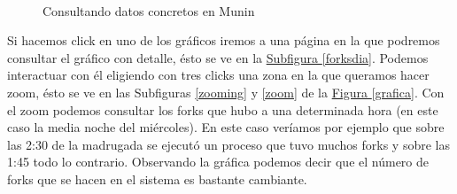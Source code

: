 \documentclass[10pt,a4paper,spanish]{article}
\numberwithin{equation}{section} %
\numberwithin{figure}{section} %
\numberwithin{table}{section} %
\begin{document}
\begin{figure}[!h]
\centering
\mbox {
\qquad
{}
}
\caption{Consultando datos concretos en Munin}
\label{datosmunin}
\end{figure}

Si hacemos click en uno de los gráficos iremos a una página en la que podremos consultar el gráfico con detalle, ésto se ve en la \hyperref[forksdia]{Subfigura \ref*{forksdia}}. Podemos interactuar con él eligiendo con tres clicks una zona en la que queramos hacer zoom, ésto se ve en las Subfiguras \hyperref[zooming]{\ref*{zooming}} y \hyperref[zoom]{\ref*{zoom}} de la \hyperref[grafica]{Figura \ref*{grafica}}. Con el zoom podemos consultar los forks que hubo a una determinada hora (en este caso la media noche del miércoles). En este caso veríamos por ejemplo que sobre las 2:30 de la madrugada se ejecutó un proceso que tuvo muchos forks y sobre las 1:45 todo lo contrario. Observando la gráfica podemos decir que el número de forks que se hacen en el sistema es bastante cambiante.
\end{document}
